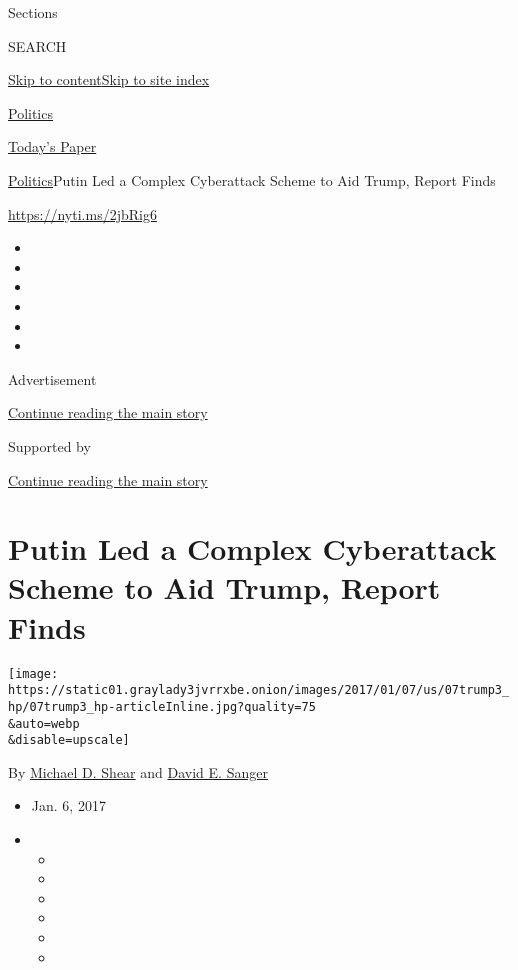 Sections

SEARCH

\protect\hyperlink{site-content}{Skip to
content}\protect\hyperlink{site-index}{Skip to site index}

\href{https://www.nytimes3xbfgragh.onion/section/politics}{Politics}

\href{https://myaccount.nytimes3xbfgragh.onion/auth/login?response_type=cookie\&client_id=vi}{}

\href{https://www.nytimes3xbfgragh.onion/section/todayspaper}{Today's
Paper}

\href{/section/politics}{Politics}\textbar{}Putin Led a Complex
Cyberattack Scheme to Aid Trump, Report Finds

\url{https://nyti.ms/2jbRig6}

\begin{itemize}
\item
\item
\item
\item
\item
\item
\end{itemize}

Advertisement

\protect\hyperlink{after-top}{Continue reading the main story}

Supported by

\protect\hyperlink{after-sponsor}{Continue reading the main story}

\hypertarget{putin-led-a-complex-cyberattack-scheme-to-aid-trump-report-finds}{%
\section{Putin Led a Complex Cyberattack Scheme to Aid Trump, Report
Finds}\label{putin-led-a-complex-cyberattack-scheme-to-aid-trump-report-finds}}

\texttt{[image: https://static01.graylady3jvrrxbe.onion/images/2017/01/07/us/07trump3\_hp/07trump3\_hp-articleInline.jpg?quality=75\\\&auto=webp\\\&disable=upscale]}

By \href{http://www.nytimes3xbfgragh.onion/by/michael-d-shear}{Michael
D. Shear} and
\href{http://www.nytimes3xbfgragh.onion/by/david-e-sanger}{David E.
Sanger}

\begin{itemize}
\item
  Jan. 6, 2017
\item
  \begin{itemize}
  \item
  \item
  \item
  \item
  \item
  \item
  \end{itemize}
\end{itemize}

